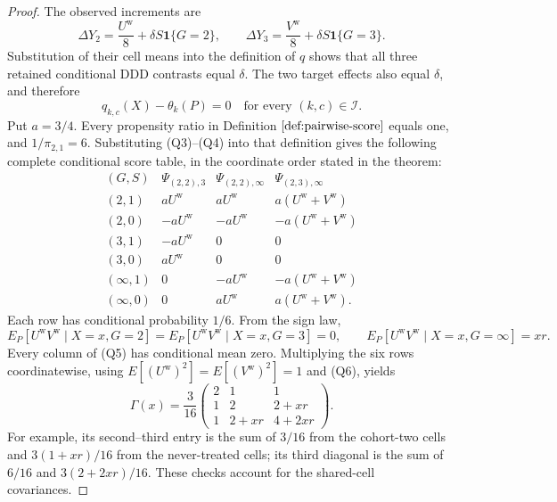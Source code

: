 \documentclass{article}
\begin{document}
\begin{proof}
The observed increments are
\[
 \Delta Y_2=\frac{U^{\mathrm w}}8+\delta S\mathbf 1\{G=2\},
 \qquad
 \Delta Y_3=\frac{V^{\mathrm w}}8+\delta S\mathbf 1\{G=3\}.
\tag{Q3}
\]
Substitution of their cell means into the definition of \(q\) shows that all three retained conditional DDD contrasts equal \(\delta\).  The two target effects also equal \(\delta\), and therefore
\[
 q_{k,c}(X)-\theta_k(P)=0
 \quad\text{for every }(k,c)\in\mathcal I.
\tag{Q4}
\]
Put \(a=3/4\).  Every propensity ratio in Definition \(\ref{def:pairwise-score}\) equals one, and \(1/\pi_{2,1}=6\).  Substituting (Q3)--(Q4) into that definition gives the following complete conditional score table, in the coordinate order stated in the theorem:
\[
\begin{array}{c|ccc}
(G,S)&\Psi_{(2,2),3}&\Psi_{(2,2),\infty}&\Psi_{(2,3),\infty}\\ \hline
(2,1)&aU^{\mathrm w}&aU^{\mathrm w}&a(U^{\mathrm w}+V^{\mathrm w})\\
(2,0)&-aU^{\mathrm w}&-aU^{\mathrm w}&-a(U^{\mathrm w}+V^{\mathrm w})\\
(3,1)&-aU^{\mathrm w}&0&0\\
(3,0)&aU^{\mathrm w}&0&0\\
(\infty,1)&0&-aU^{\mathrm w}&-a(U^{\mathrm w}+V^{\mathrm w})\\
(\infty,0)&0&aU^{\mathrm w}&a(U^{\mathrm w}+V^{\mathrm w}).
\end{array}
\tag{Q5}
\]
Each row has conditional probability \(1/6\).  From the sign law,
\[
 E_P[U^{\mathrm w}V^{\mathrm w}\mid X=x,G=2]
 =E_P[U^{\mathrm w}V^{\mathrm w}\mid X=x,G=3]=0,
 \qquad
 E_P[U^{\mathrm w}V^{\mathrm w}\mid X=x,G=\infty]=xr.
\tag{Q6}
\]
Every column of (Q5) has conditional mean zero.  Multiplying the six rows coordinatewise, using \(E[(U^{\mathrm w})^2]=E[(V^{\mathrm w})^2]=1\) and (Q6), yields
\[
 \Gamma(x)=\frac{3}{16}
 \begin{pmatrix}
 2&1&1\\
 1&2&2+xr\\
 1&2+xr&4+2xr
 \end{pmatrix}.
\tag{Q7}
\]
For example, its second--third entry is the sum of \(3/16\) from the cohort-two cells and \(3(1+xr)/16\) from the never-treated cells; its third diagonal is the sum of \(6/16\) and \(3(2+2xr)/16\).  These checks account for the shared-cell covariances.


\end{proof}
\end{document}
